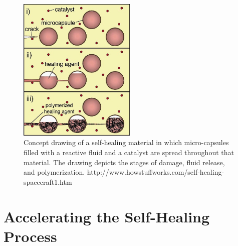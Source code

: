 \begin{figure}[ht!]
\centering
\includegraphics[width=0.5\textwidth]{eps_pics/selfHealingMedium}
\caption{ Concept drawing of a self-healing material in which micro-capsules filled with a reactive fluid and a catalyst are spread throughout that material. The drawing depicts the stages of damage, fluid release, and polymerization.
\newline
http://www.howstuffworks.com/self-healing-spacecraft1.htm
	 \label{fig:selfHealingMedium}} 
\end{figure}

\section{Accelerating the Self-Healing Process}

